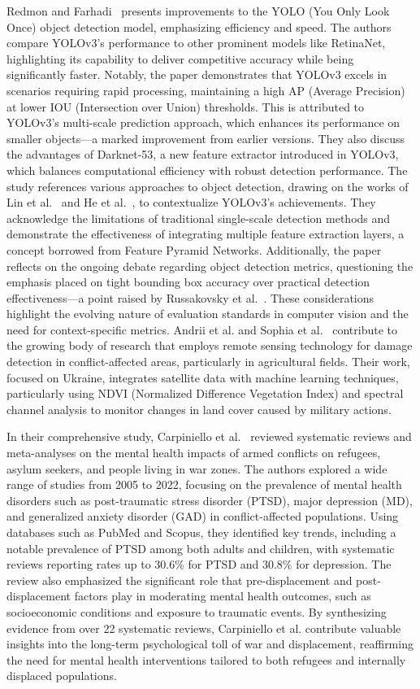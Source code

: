 \documentclass[conference]{IEEEtran}
\begin{document}
Redmon and Farhadi~\cite{b11} presents improvements to the YOLO (You Only Look Once) object detection model, emphasizing efficiency and speed. The authors compare YOLOv3's performance to other prominent models like RetinaNet, highlighting its capability to deliver competitive accuracy while being significantly faster. Notably, the paper demonstrates that YOLOv3 excels in scenarios requiring rapid processing, maintaining a high AP (Average Precision) at lower IOU (Intersection over Union) thresholds. This is attributed to YOLOv3’s multi-scale prediction approach, which enhances its performance on smaller objects—a marked improvement from earlier versions. They also discuss the advantages of Darknet-53, a new feature extractor introduced in YOLOv3, which balances computational efficiency with robust detection performance. The study references various approaches to object detection, drawing on the works of Lin et al.~\cite{b12} and He et al.~\cite{b13}, to contextualize YOLOv3's achievements. They acknowledge the limitations of traditional single-scale detection methods and demonstrate the effectiveness of integrating multiple feature extraction layers, a concept borrowed from Feature Pyramid Networks. Additionally, the paper reflects on the ongoing debate regarding object detection metrics, questioning the emphasis placed on tight bounding box accuracy over practical detection effectiveness—a point raised by Russakovsky et al.~\cite{b14}. These considerations highlight the evolving nature of evaluation standards in computer vision and the need for context-specific metrics. Andrii et al. and Sophia et al.~\cite{b15} contribute to the growing body of research that employs remote sensing technology for damage detection in conflict-affected areas, particularly in agricultural fields. Their work, focused on Ukraine, integrates satellite data with machine learning techniques, particularly using NDVI (Normalized Difference Vegetation Index) and spectral channel analysis to monitor changes in land cover caused by military actions.

In their comprehensive study, Carpiniello et al.~\cite{b16} reviewed systematic reviews and meta-analyses on the mental health impacts of armed conflicts on refugees, asylum seekers, and people living in war zones. The authors explored a wide range of studies from 2005 to 2022, focusing on the prevalence of mental health disorders such as post-traumatic stress disorder (PTSD), major depression (MD), and generalized anxiety disorder (GAD) in conflict-affected populations. Using databases such as PubMed and Scopus, they identified key trends, including a notable prevalence of PTSD among both adults and children, with systematic reviews reporting rates up to 30.6\% for PTSD and 30.8\% for depression. The review also emphasized the significant role that pre-displacement and post-displacement factors play in moderating mental health outcomes, such as socioeconomic conditions and exposure to traumatic events. By synthesizing evidence from over 22 systematic reviews, Carpiniello et al. contribute valuable insights into the long-term psychological toll of war and displacement, reaffirming the need for mental health interventions tailored to both refugees and internally displaced populations.
\end{document}
